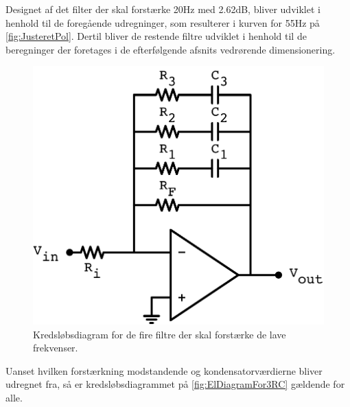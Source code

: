 \noindent
%
Designet af det filter der skal forstærke 20Hz med 2.62dB, bliver udviklet i henhold til de foregående udregninger, som resulterer i kurven for 55Hz på \autoref{fig:JusteretPol}. Dertil bliver de restende filtre udviklet i henhold til de beregninger der foretages i de efterfølgende afsnits vedrørende dimensionering.
%
\begin{figure}[H]
	\centering
	\includegraphics[resolution=300,scale=\circuitSize]{Figure/DesignAfFilter/FilterWith3.pdf}
	\caption{Kredsløbsdiagram for de fire filtre der skal forstærke de lave frekvenser.}
	\label{fig:ElDiagramFor3RC}
\end{figure}
\noindent
%
\newpage
\noindent
%
Uanset hvilken forstærkning modstandende og kondensatorværdierne bliver udregnet fra, så er kredsløbsdiagrammet på \autoref{fig:ElDiagramFor3RC} gældende for alle.
%

